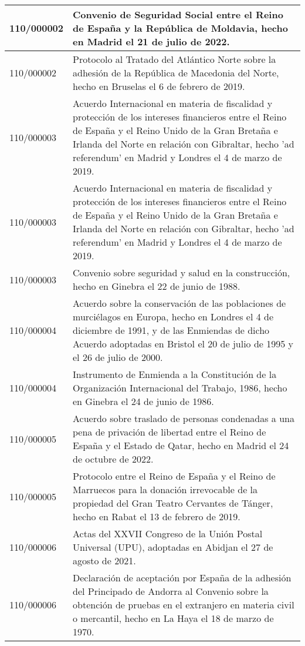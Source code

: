 {\begin{table}[H]
\begin{center}
\begin{tabularx}{\linewidth}{| l | X |}
\hline
110/000002 & Convenio de Seguridad Social entre el Reino de España y la República de Moldavia, hecho en Madrid el 21 de julio de 2022. \\
\hline
110/000002 & Protocolo al Tratado del Atlántico Norte sobre la adhesión de la República de Macedonia del Norte, hecho en Bruselas el 6 de febrero de 2019. \\
\hline
110/000003 & Acuerdo Internacional en materia de fiscalidad y protección de los intereses financieros entre el Reino de España y el Reino Unido de la Gran Bretaña e Irlanda del Norte en relación con Gibraltar, hecho 'ad referendum' en Madrid y Londres el 4 de marzo de 2019. \\
\hline
110/000003 & Acuerdo Internacional en materia de fiscalidad y protección de los intereses financieros entre el Reino de España y el Reino Unido de la Gran Bretaña e Irlanda del Norte en relación con Gibraltar, hecho 'ad referendum' en Madrid y Londres el 4 de marzo de 2019. \\
\hline
110/000003 & Convenio sobre seguridad y salud en la construcción, hecho en Ginebra el 22 de junio de 1988. \\
\hline
110/000004 & Acuerdo sobre la conservación de las poblaciones de murciélagos en Europa, hecho en Londres el 4 de diciembre de 1991, y de las Enmiendas de dicho Acuerdo adoptadas en Bristol el 20 de julio de 1995 y el 26 de julio de 2000. \\
\hline
110/000004 & Instrumento de Enmienda a la Constitución de la Organización Internacional del Trabajo, 1986, hecho en Ginebra el 24 de junio de 1986. \\
\hline
110/000005 & Acuerdo sobre traslado de personas condenadas a una pena de privación de libertad entre el Reino de España y el Estado de Qatar, hecho en Madrid el 24 de octubre de 2022. \\
\hline
110/000005 & Protocolo entre el Reino de España y el Reino de Marruecos para la donación irrevocable de la propiedad del Gran Teatro Cervantes de Tánger, hecho en Rabat el 13 de febrero de 2019. \\
\hline
110/000006 & Actas del XXVII Congreso de la Unión Postal Universal (UPU), adoptadas en Abidjan el 27 de agosto de 2021. \\
\hline
110/000006 & Declaración de aceptación por España de la adhesión del Principado de Andorra al Convenio sobre la obtención de pruebas en el extranjero en materia civil o mercantil, hecho en La Haya el 18 de marzo de 1970. \\

\end{tabularx}
\end{center}
\end{table}}
